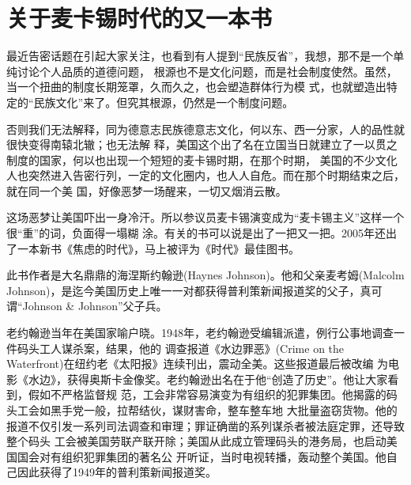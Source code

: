 \documentclass[10pt]{article}
\begin{document}
\pagestyle{empty}

\begin{center}
\end{center}

{\footnotesize\textsf{\tableofcontents}}
\pagebreak
\setcounter{page}{1}


{\small

\section{关于麦卡锡时代的又一本书}

最近告密话题在引起大家关注，也看到有人提到``民族反省''，我想，那不是一个单纯讨论个人品质的道德问题，
根源也不是文化问题，而是社会制度使然。虽然，当一个扭曲的制度长期笼罩，久而久之，也会塑造群体行为模
式，也就塑造出特定的``民族文化''来了。但究其根源，仍然是一个制度问题。

否则我们无法解释，同为德意志民族德意志文化，何以东、西一分家，人的品性就很快变得南辕北辙；也无法解
释，美国这个出了名在立国当日就建立了一以贯之制度的国家，何以也出现一个短短的麦卡锡时期，在那个时期，
美国的不少文化人也突然进入告密行列，一定的文化圈内，也人人自危。而在那个时期结束之后，就在同一个美
国，好像恶梦一场醒来，一切又烟消云散。

这场恶梦让美国吓出一身冷汗。所以参议员麦卡锡演变成为``麦卡锡主义''这样一个很``重''的词，负面得一塌糊
涂。有关的书可以说是出了一把又一把。2005年还出了一本新书《焦虑的时代》，马上被评为《时代》最佳图书。

此书作者是大名鼎鼎的海涅斯\textperiodcentered 约翰逊(Haynes Johnson)。他和父亲麦考姆(Malcolm
Johnson)，是迄今美国历史上唯一一对都获得普利策新闻报道奖的父子，真可谓``Johnson \& Johnson''父子兵。

老约翰逊当年在美国家喻户晓。1948年，老约翰逊受编辑派遣，例行公事地调查一件码头工人谋杀案，结果，他的
调查报道《水边罪恶》(Crime on the Waterfront)在纽约老《太阳报》连续刊出，震动全美。这些报道最后被改编
为电影《水边》，获得奥斯卡金像奖。老约翰逊出名在于他``创造了历史''。他让大家看到，假如不严格监督规
范，工会非常容易演变为有组织的犯罪集团。他揭露的码头工会如黑手党一般，拉帮结伙，谋财害命，整车整车地
大批量盗窃货物。他的报道不仅引发一系列司法调查和审理；罪证确凿的系列谋杀者被法庭定罪，还导致整个码头
工会被美国劳联\myrule 产联开除；美国从此成立管理码头的港务局，也启动美国国会对有组织犯罪集团的著名公
开听证，当时电视转播，轰动整个美国。他自己因此获得了1949年的普利策新闻报道奖。

}
\end{document}
